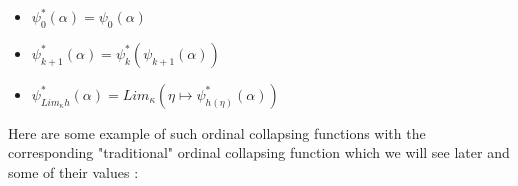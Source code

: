 \documentclass[10pt]{article}
\begin{document}
\begin{itemize}
     \setlength{\itemsep}{1pt}
     \setlength{\parskip}{0pt}
     \setlength{\parsep}{0pt}

\item \( \psi^*_0(\alpha) = \psi_0(\alpha) \)

\item \( \psi^*_{k+1}(\alpha) = \psi^*_k(\psi_{k+1}(\alpha)) \)

\item \( \psi^*_{Lim_\kappa h}(\alpha) = Lim_\kappa (\eta \mapsto \psi^*_{h(\eta)}(\alpha)) \)

\end{itemize}


\begin{comment}
We can generalize this function to transfinite indices, for example \( \psi^*_\omega(\alpha) = lim [ \psi^*_\bullet(\alpha) ] \).
\end{comment}

\begin{comment}
To simplify notation, \( \psi_1 \) will sometimes be written \( \psi \).
\end{comment}

\bigskip



Here are some example of such ordinal collapsing functions with the corresponding "traditional" ordinal collapsing function which we will see later and some of their values :

\bigskip
\end{document}
